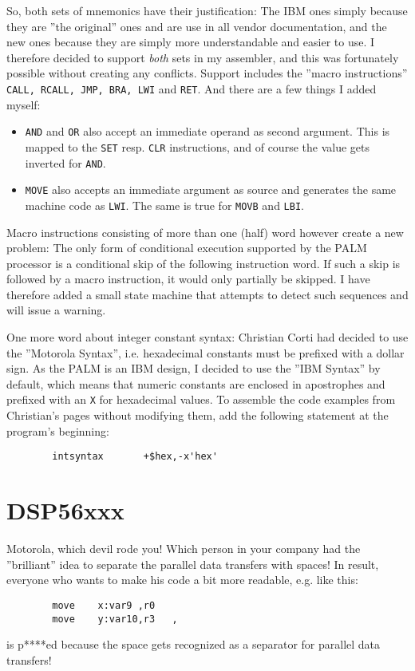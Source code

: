 \documentclass[12pt,twoside]{report}
\begin{document}
So, both sets of mnemonics have their justification: The IBM ones
simply because they are ''the original'' ones and are use in all vendor
documentation, and the new ones because they are simply more
understandable and easier to use.  I therefore decided to support {\em
both} sets in my assembler, and this was fortunately possible without
creating any conflicts.  Support includes the ''macro instructions''
{\tt CALL, RCALL, JMP, BRA, LWI} and {\tt RET}.  And there are a few
things I added myself:
\begin{itemize}
\item{{\tt AND} and {\tt OR} also accept an immediate operand as second 
      argument. This is mapped to the {\tt SET} resp. {\tt CLR} instructions,
      and of course the value gets inverted for {\tt AND}.}
\item{{\tt MOVE} also accepts an immediate argument as source and generates
      the same machine code as {\tt LWI}.  The same is true for {\tt MOVB}
      and {\tt LBI}.}
\end{itemize}
Macro instructions consisting of more than one (half) word however
create a new problem: The only form of conditional execution supported
by the PALM processor is a conditional skip of the following
instruction word.  If such a skip is followed by a macro instruction,
it would only partially be skipped.  I have therefore added a small
state machine that attempts to detect such sequences and will issue a
warning.

One more word about integer constant syntax: Christian Corti had
decided to use the ''Motorola Syntax'', i.e.  hexadecimal constants
must be prefixed with a dollar sign.  As the PALM is an IBM design, I
decided to use the ''IBM Syntax'' by default, which means that numeric
constants are enclosed in apostrophes and prefixed with an {\tt X} for
hexadecimal values.  To assemble the code examples from Christian's
pages without modifying them, add the following statement at the
program's beginning:
\begin{verbatim}
        intsyntax       +$hex,-x'hex'
\end{verbatim}


\section{DSP56xxx}

Motorola, which devil rode you!  Which person in your company had the
''brilliant'' idea to separate the parallel data transfers with spaces!
In result, everyone who wants to make his code a bit more readable,
e.g. like this:
\begin{verbatim}
        move    x:var9 ,r0
        move    y:var10,r3   ,
\end{verbatim}
is p****ed because the space gets recognized as a separator for
parallel data transfers!
\end{document}
